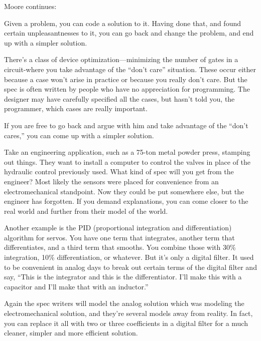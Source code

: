 \begin{interview}
Moore continues:
\begin{tfquot}

Given a problem, you can code a solution to it. Having done that, and found
certain unpleasantnesses to it, you can go back and change the problem,
and end up with a simpler solution.

There's a class of device optimization---minimizing the number of gates in a
circuit-where you take advantage of the ``don't care'' situation. These
occur either because a case won't arise in practice or because you really
don't care. But the spec is often written by people who have no appreciation
for programming. The designer may have carefully specified all the cases,
but hasn't told you, the programmer, which cases are really important.

If you are free to go back and argue with him and take advantage of the
``don't cares,'' you can come up with a simpler solution.

Take an engineering application, such as a 75-ton metal powder press,
stamping out things. They want to install a computer to control the valves
in place of the hydraulic control previously used. What kind of spec will you
get from the engineer? Most likely the sensors were placed for convenience
from an electromechanical standpoint. Now they could be put somewhere
else, but the engineer has forgotten. If you demand explanations, you can
come closer to the real world and further from their model of the world.

Another example is the PID (proportional integration and differentiation)
algorithm for servos. You have one term that integrates, another term that
differentiates, and a third term that smooths. You combine those with
30\% integration, 10\% differentiation, or whatever. But it's only a digital
filter. It used to be convenient in analog days to break out certain terms of
the digital filter and say, ``This is the integrator and this is the
differentiator. I'll make this with a capacitor and I'll make that with an inductor.''

Again the spec writers will model the analog solution which was modeling
the electromechanical solution, and they're several models away from
reality. In fact, you can replace it all with two or three coefficients in a digital
filter for a much cleaner, simpler and more efficient solution.
\end{tfquot}
\end{interview}

